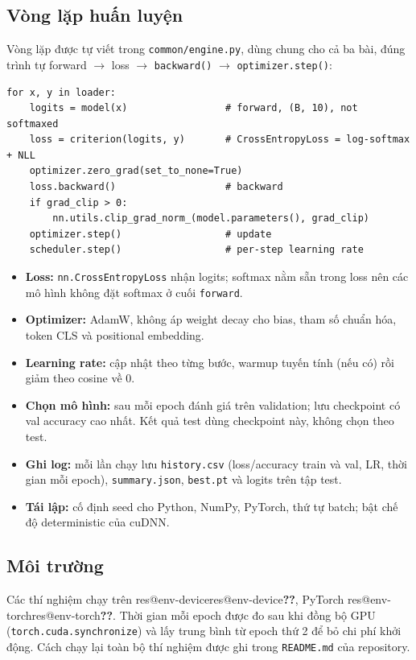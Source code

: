 \documentclass[twoside,final]{hcmut-report}
\makeatletter
\newcommand{\res}[1]{\ifcsname res@#1\endcsname\csname res@#1\endcsname\else\textbf{??}\fi}
\makeatother
\begin{document}
\subsection{Vòng lặp huấn luyện}
Vòng lặp được tự viết trong \texttt{common/engine.py}, dùng chung cho cả ba bài, đúng trình tự
forward $\rightarrow$ loss $\rightarrow$ \texttt{backward()} $\rightarrow$ \texttt{optimizer.step()}:

\begin{lstlisting}[caption={Vòng lặp huấn luyện tự viết (rút gọn từ \texttt{common/engine.py})}]
for x, y in loader:
    logits = model(x)                 # forward, (B, 10), not softmaxed
    loss = criterion(logits, y)       # CrossEntropyLoss = log-softmax + NLL
    optimizer.zero_grad(set_to_none=True)
    loss.backward()                   # backward
    if grad_clip > 0:
        nn.utils.clip_grad_norm_(model.parameters(), grad_clip)
    optimizer.step()                  # update
    scheduler.step()                  # per-step learning rate
\end{lstlisting}

\begin{itemize}
  \item \textbf{Loss:} \texttt{nn.CrossEntropyLoss} nhận logits; softmax nằm sẵn trong loss nên các mô hình không đặt softmax ở cuối \texttt{forward}.
  \item \textbf{Optimizer:} AdamW, không áp weight decay cho bias, tham số chuẩn hóa, token CLS và positional embedding.
  \item \textbf{Learning rate:} cập nhật theo từng bước, warmup tuyến tính (nếu có) rồi giảm theo cosine về 0.
  \item \textbf{Chọn mô hình:} sau mỗi epoch đánh giá trên validation; lưu checkpoint có val accuracy cao nhất. Kết quả test dùng checkpoint này, không chọn theo test.
  \item \textbf{Ghi log:} mỗi lần chạy lưu \texttt{history.csv} (loss/accuracy train và val, LR, thời gian mỗi epoch), \texttt{summary.json}, \texttt{best.pt} và logits trên tập test.
  \item \textbf{Tái lập:} cố định seed cho Python, NumPy, PyTorch, thứ tự batch; bật chế độ deterministic của cuDNN.
\end{itemize}

\subsection{Môi trường}
Các thí nghiệm chạy trên \res{env-device}, PyTorch \res{env-torch}. Thời gian mỗi epoch được đo sau khi đồng bộ GPU (\texttt{torch.cuda.synchronize}) và lấy trung bình từ epoch thứ 2 để bỏ chi phí khởi động. Cách chạy lại toàn bộ thí nghiệm được ghi trong \texttt{README.md} của repository.
\end{document}
